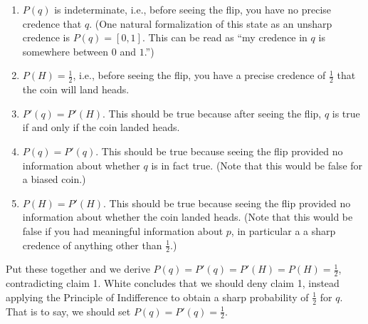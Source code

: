 \documentclass[letterpaper,12pt]{article}
\begin{document}
\begin{enumerate}
\item
$P(q)$ is indeterminate, i.e., before seeing the flip, you have no precise credence that $q$. (One natural formalization of this state as an unsharp credence is $P(q) = [0, 1]$. This can be read as ``my credence in $q$ is somewhere between $0$ and $1$.'')
\item
$P(H) = \frac{1}{2}$, i.e., before seeing the flip, you have a precise credence of $\frac{1}{2}$ that the coin will land heads.
\item
$P'(q) = P'(H)$. This should be true because after seeing the flip, $q$ is true if and only if the coin landed heads.
\item
$P(q) = P'(q)$. This should be true because seeing the flip provided no information about whether $q$ is in fact true. (Note that this would be false for a biased coin.)
\item
$P(H) = P'(H)$. This should be true because seeing the flip provided no information about whether the coin landed heads. (Note that this would be false if you had meaningful information about $p$, in particular a a sharp credence of anything other than $\frac{1}{2}$.)
\end{enumerate}

Put these together and we derive $P(q) = P'(q) = P'(H) = P(H) = \frac{1}{2}$, contradicting claim 1. White concludes that we should deny claim 1, instead applying the Principle of Indifference to obtain a sharp probability of $\frac{1}{2}$ for $q$. That is to say, we should set $P(q) = P'(q) = \frac{1}{2}$.
\end{document}

